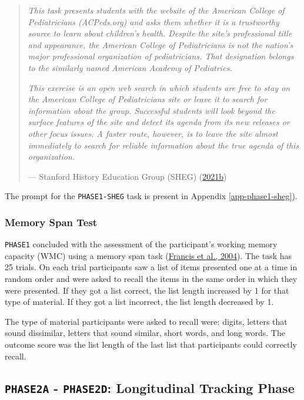\documentclass[letterpaper, nobind]{templates/ociamthesis}
\begin{document}
\begin{quote}
\emph{This task presents students with the website of the American College of Pediatricians (ACPeds.org) and asks them whether it is a trustworthy source to learn about children's health. Despite the site's professional title and appearance, the American College of Pediatricians is not the nation's major professional organization of pediatricians. That designation belongs to the similarly named American Academy of Pediatrics.}

\emph{This exercise is an open web search in which students are free to stay on the American College of Pediatricians site or leave it to search for information about the group. Successful students will look beyond the surface features of the site and detect its agenda from its new releases or other focus issues. A faster route, however, is to leave the site almost immediately to search for reliable information about the true agenda of this organization.}

\hfill --- Stanford History Education Group (SHEG) (\protect\hyperlink{ref-sheg2021website-reliability}{2021b})
\end{quote}

The prompt for the \texttt{PHASE1-SHEG} task is present in Appendix \ref{app-phase1-sheg}).

\hypertarget{memory-span-test}{%
\subsubsection{Memory Span Test}\label{memory-span-test}}

\texttt{PHASE1} concluded with the assessment of the participant's working memory capacity (WMC) using a memory span task (\protect\hyperlink{ref-francis2004coglab}{Francis et al., 2004}).
The task has 25 trials. On each trial participants saw a list of items presented one at a time in random order and were asked to recall the items in the same order in which they were presented. If they got a list correct, the list length increased by 1 for that type of material. If they got a list incorrect, the list length decreased by 1.

The type of material participants were asked to recall were: digits, letters that sound dissimilar, letters that sound similar, short words, and long words. The outcome score was the list length of the last list that participants could correctly recall.

\hypertarget{sec-method-phase2}{%
\subsection{\texorpdfstring{\texttt{PHASE2A} - \texttt{PHASE2D}: Longitudinal Tracking Phase}{PHASE2A - PHASE2D: Longitudinal Tracking Phase}}\label{sec-method-phase2}}
\end{document}
